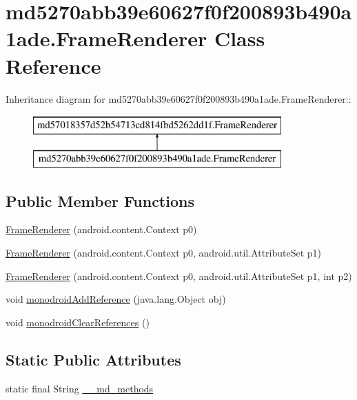 \hypertarget{classmd5270abb39e60627f0f200893b490a1ade_1_1_frame_renderer}{
\section{md5270abb39e60627f0f200893b490a1ade.FrameRenderer Class Reference}
\label{classmd5270abb39e60627f0f200893b490a1ade_1_1_frame_renderer}
}
Inheritance diagram for md5270abb39e60627f0f200893b490a1ade.FrameRenderer::\begin{figure}[H]
\begin{center}
\leavevmode
\includegraphics[height=2cm]{classmd5270abb39e60627f0f200893b490a1ade_1_1_frame_renderer}
\end{center}
\end{figure}
\subsection*{Public Member Functions}
\begin{CompactItemize}
\item 
\hyperlink{classmd5270abb39e60627f0f200893b490a1ade_1_1_frame_renderer_cee389c5c7dfa4207930e0f43ce1349f}{FrameRenderer} (android.content.Context p0)
\item 
\hyperlink{classmd5270abb39e60627f0f200893b490a1ade_1_1_frame_renderer_ea6c9c6c24382a82ce1dec0437826cbc}{FrameRenderer} (android.content.Context p0, android.util.AttributeSet p1)
\item 
\hyperlink{classmd5270abb39e60627f0f200893b490a1ade_1_1_frame_renderer_543d9dca2ecf03f07b3939703cdb19eb}{FrameRenderer} (android.content.Context p0, android.util.AttributeSet p1, int p2)
\item 
void \hyperlink{classmd5270abb39e60627f0f200893b490a1ade_1_1_frame_renderer_fab5536e45566fe5a5bb5bd22faef608}{monodroidAddReference} (java.lang.Object obj)
\item 
void \hyperlink{classmd5270abb39e60627f0f200893b490a1ade_1_1_frame_renderer_d655b8c79cca686e12df7655fe93f7f7}{monodroidClearReferences} ()
\end{CompactItemize}
\subsection*{Static Public Attributes}
\begin{CompactItemize}
\item 
static final String \hyperlink{classmd5270abb39e60627f0f200893b490a1ade_1_1_frame_renderer_c9ef5c3ae0c3ecaad8abeb4649d6a402}{\_\-\_\-md\_\-methods}
\end{CompactItemize}
